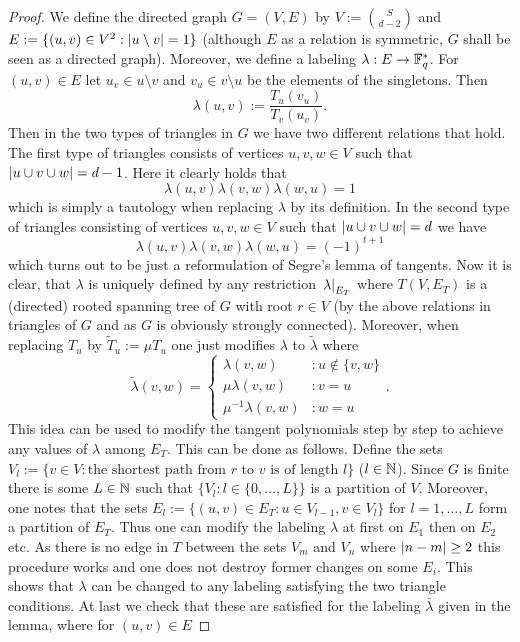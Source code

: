 \documentclass[a4paper]{article}
\begin{document}
\begin{proof}
  We define the directed graph $G=(V,E)$ by $V:=\binom{S}{d-2}$ and $E:=\{(u,v)\in V^2:\left|u\setminus v\right|=1\}$ (although $E$ as a relation is symmetric, $G$ shall be seen as a directed graph).
  Moreover, we define a labeling $\lambda:E\rightarrow \mathbb{F}_{q}^*$. For $(u,v)\in E$ let $u_v\in u\setminus v$ and $v_u\in v\setminus u$ be the elements of the singletons. Then 
  \begin{equation}
    \lambda(u,v):=\frac{T_u(v_u)}{T_v(u_v)}\text{.} 
  \end{equation}
  Then in the two types of triangles in $G$ we have two different relations that hold.
  The first type of triangles consists of vertices $u,v,w\in V$ such that $\left|u\cup v\cup w\right|=d-1$.
  Here it clearly holds that
  \begin{equation}
    \lambda(u,v)\lambda(v,w)\lambda(w,u)=1
  \end{equation}
  which is simply a tautology when replacing $\lambda$ by its definition.
  In the second type of triangles consisting of vertices $u,v,w\in V$ such that $\left|u\cup v\cup w\right|=d$ we have
  \begin{equation}
    \lambda(u,v)\lambda(v,w)\lambda(w,u)=(-1)^{t+1}
  \end{equation}
  which turns out to be just a reformulation of Segre's lemma of tangents.
  Now it is clear, that $\lambda$ is uniquely defined by any restriction $\left. \lambda\right\vert_{E_T}$ where $T(V,E_T)$ is a (directed) rooted spanning tree of $G$ with root $r\in V$ (by the above relations in triangles of $G$ and as $G$ is obviously strongly connected).
  Moreover, when replacing $T_u$ by $\tilde{T}_u:=\mu T_u$ one just modifies $\lambda$ to $\tilde{\lambda}$ where 
  \begin{equation}
    \tilde{\lambda}(v,w)=\begin{cases} 
      \lambda(v,w) & : u\notin\{v,w\}\\
      \mu\lambda(v,w) &: v=u\\
      \mu^{-1}\lambda(v,w) &: w=u
    \end{cases}\text{.}
  \end{equation}
  This idea can be used to modify the tangent polynomials step by step to achieve any values of $\lambda$ among $E_T$.
  This can be done as follows. Define the sets $V_l:=\{v\in V: \text{the shortest path from } r \text{ to } v \text{ is of length } l\}$ ($l\in\mathbb{N}$). Since $G$ is finite there is some $L\in\mathbb{N}$ such that $\{V_l:l\in\{0,\ldots,L\}\}$ is a partition of $V$. Moreover, one notes that the sets $E_l:=\{(u,v)\in E_T:u\in V_{l-1},v\in V_l\}$ for $l=1,\ldots,L$ form a partition of $E_T$. Thus one can modify the labeling $\lambda$ at first on $E_1$ then on $E_2$ etc. As there is no edge in $T$ between the sets $V_m$ and $V_n$ where $\left|n-m\right|\geq 2$ this procedure works and one does not destroy former changes on some $E_i$. 
  This shows that $\lambda$ can be changed to any labeling satisfying the two triangle conditions.
  At last we check that these are satisfied for the labeling $\bar{\lambda}$ given in the lemma, where for $(u,v)\in E$


\end{proof}
\end{document}
